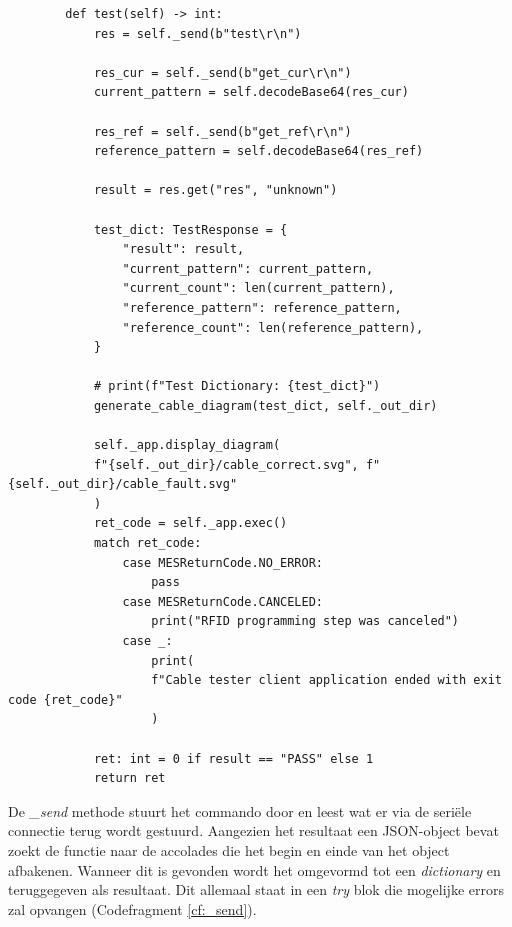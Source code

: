 \begin{listing}[H]
    \begin{verbatim}
        def test(self) -> int:
            res = self._send(b"test\r\n")
            
            res_cur = self._send(b"get_cur\r\n")
            current_pattern = self.decodeBase64(res_cur)
            
            res_ref = self._send(b"get_ref\r\n")
            reference_pattern = self.decodeBase64(res_ref)
            
            result = res.get("res", "unknown")
            
            test_dict: TestResponse = {
                "result": result,
                "current_pattern": current_pattern,
                "current_count": len(current_pattern),
                "reference_pattern": reference_pattern,
                "reference_count": len(reference_pattern),
            }
            
            # print(f"Test Dictionary: {test_dict}")
            generate_cable_diagram(test_dict, self._out_dir)
            
            self._app.display_diagram(
            f"{self._out_dir}/cable_correct.svg", f"{self._out_dir}/cable_fault.svg"
            )
            ret_code = self._app.exec()
            match ret_code:
                case MESReturnCode.NO_ERROR:
                    pass
                case MESReturnCode.CANCELED:
                    print("RFID programming step was canceled")
                case _:
                    print(
                    f"Cable tester client application ended with exit code {ret_code}"
                    )
            
            ret: int = 0 if result == "PASS" else 1
            return ret
    \end{verbatim}
    \caption[Ctclient test]{Code van de test methode.}
    \label{cf:test_ctclient}
\end{listing}

De \textit{\_send} methode stuurt het commando door en leest wat er via de seriële connectie terug wordt gestuurd. Aangezien het resultaat een JSON-object bevat zoekt de functie naar de accolades die het begin en einde van het object afbakenen. Wanneer dit is gevonden wordt het omgevormd tot een \textit{dictionary} en teruggegeven als resultaat. Dit allemaal staat in een \textit{try} blok die mogelijke errors zal opvangen (Codefragment \ref{cf:_send}).

